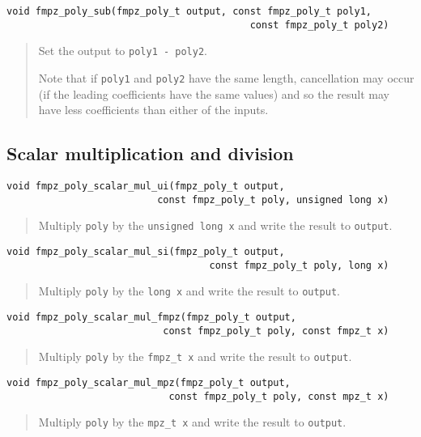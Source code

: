 \documentclass[a4paper,10pt]{article}
\newcommand{\code}{\lstinline}
\begin{document}
\begin{lstlisting}
void fmpz_poly_sub(fmpz_poly_t output, const fmpz_poly_t poly1, 
                                          const fmpz_poly_t poly2) 
\end{lstlisting}
\begin{quote}
Set the output to \code{poly1 - poly2}. 

Note that if \code{poly1} and \code{poly2} have the same length, cancellation may occur (if the leading coefficients have the same values) and so the result may have less coefficients than either of the inputs. 
\end{quote}

\subsection{Scalar multiplication and division}

\begin{lstlisting}
void fmpz_poly_scalar_mul_ui(fmpz_poly_t output, 
                          const fmpz_poly_t poly, unsigned long x)
\end{lstlisting}
\begin{quote}
Multiply \code{poly} by the \code{unsigned long x} and write the result to \code{output}. 
\end{quote}

\begin{lstlisting}
void fmpz_poly_scalar_mul_si(fmpz_poly_t output, 
                                   const fmpz_poly_t poly, long x)
\end{lstlisting}
\begin{quote}
Multiply \code{poly} by the \code{long x} and write the result to \code{output}. 
\end{quote}

\begin{lstlisting}
void fmpz_poly_scalar_mul_fmpz(fmpz_poly_t output, 
                           const fmpz_poly_t poly, const fmpz_t x) 
\end{lstlisting}
\begin{quote}
Multiply \code{poly} by the \code{fmpz_t x} and write the result to \code{output}. 
\end{quote}

\begin{lstlisting}
void fmpz_poly_scalar_mul_mpz(fmpz_poly_t output, 
                            const fmpz_poly_t poly, const mpz_t x) 
\end{lstlisting}
\begin{quote}
Multiply \code{poly} by the \code{mpz_t x} and write the result to \code{output}. 
\end{quote}
\end{document}
